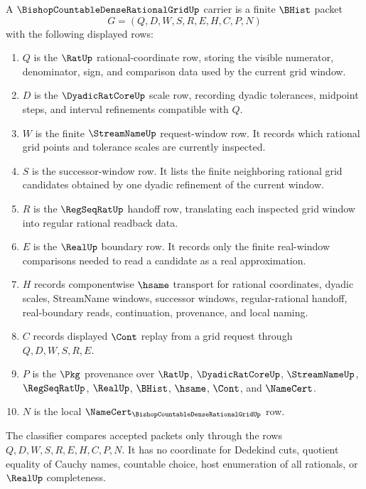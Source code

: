 \begin{definition}
\label{def:bishop-countable-dense-rational-grid-carrier}
A $\BishopCountableDenseRationalGridUp$ carrier is a finite $\BHist$ packet
$$
G=(Q,D,W,S,R,E,H,C,P,N)
$$
with the following displayed rows:
\begin{enumerate}
\item $Q$ is the $\RatUp$ rational-coordinate row, storing the visible numerator, denominator, sign, and comparison data used by the current grid window.
\item $D$ is the $\DyadicRatCoreUp$ scale row, recording dyadic tolerances, midpoint steps, and interval refinements compatible with $Q$.
\item $W$ is the finite $\StreamNameUp$ request-window row. It records which rational grid points and tolerance scales are currently inspected.
\item $S$ is the successor-window row. It lists the finite neighboring rational grid candidates obtained by one dyadic refinement of the current window.
\item $R$ is the $\RegSeqRatUp$ handoff row, translating each inspected grid window into regular rational readback data.
\item $E$ is the $\RealUp$ boundary row. It records only the finite real-window comparisons needed to read a candidate as a real approximation.
\item $H$ records componentwise $\hsame$ transport for rational coordinates, dyadic scales, StreamName windows, successor windows, regular-rational handoff, real-boundary reads, continuation, provenance, and local naming.
\item $C$ records displayed $\Cont$ replay from a grid request through $Q,D,W,S,R,E$.
\item $P$ is the $\Pkg$ provenance over $\RatUp$, $\DyadicRatCoreUp$, $\StreamNameUp$, $\RegSeqRatUp$, $\RealUp$, $\BHist$, $\hsame$, $\Cont$, and $\NameCert$.
\item $N$ is the local $\NameCert_{\BishopCountableDenseRationalGridUp}$ row.
\end{enumerate}
The classifier compares accepted packets only through the rows $Q,D,W,S,R,E,H,C,P,N$. It has no coordinate for Dedekind cuts, quotient equality of Cauchy names, countable choice, host enumeration of all rationals, or $\RealUp$ completeness.
\end{definition}

